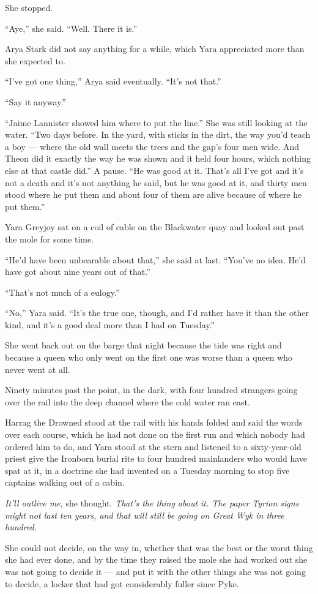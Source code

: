 She stopped.

“Aye,” she said. “Well. There it is.”

Arya Stark did not say anything for a while, which Yara appreciated more than she expected to.

“I’ve got one thing,” Arya said eventually. “It’s not that.”

“Say it anyway.”

“Jaime Lannister showed him where to put the line.” She was still looking at the water. “Two days before. In the yard, with sticks in the dirt, the way you’d teach a boy — where the old wall meets the trees and the gap’s four men wide. And Theon did it exactly the way he was shown and it held four hours, which nothing else at that castle did.” A pause. “He was good at it. That’s all I’ve got and it’s not a death and it’s not anything he said, but he was good at it, and thirty men stood where he put them and about four of them are alive because of where he put them.”

Yara Greyjoy sat on a coil of cable on the Blackwater quay and looked out past the mole for some time.

“He’d have been unbearable about that,” she said at last. “You’ve no idea. He’d have got about nine years out of that.”

“That’s not much of a eulogy.”

“No,” Yara said. “It’s the true one, though, and I’d rather have it than the other kind, and it’s a good deal more than I had on Tuesday.”

\sceneBreak

She went back out on the barge that night because the tide was right and because a queen who only went on the first one was worse than a queen who never went at all.

Ninety minutes past the point, in the dark, with four hundred strangers going over the rail into the deep channel where the cold water ran east.

Harrag the Drowned stood at the rail with his hands folded and said the words over each course, which he had not done on the first run and which nobody had ordered him to do, and Yara stood at the stern and listened to a sixty-year-old priest give the Ironborn burial rite to four hundred mainlanders who would have spat at it, in a doctrine she had invented on a Tuesday morning to stop five captains walking out of a cabin.

\textit{It’ll outlive me,} she thought. \textit{That’s the thing about it. The paper Tyrion signs might not last ten years, and that will still be going on Great Wyk in three hundred.}

She could not decide, on the way in, whether that was the best or the worst thing she had ever done, and by the time they raised the mole she had worked out she was not going to decide it — and put it with the other things she was not going to decide, a locker that had got considerably fuller since Pyke.